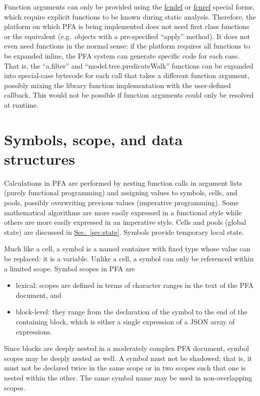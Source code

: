 \documentclass{article}
\theoremstyle{definition}
\begin{document}
Function arguments can only be provided using the \hyperlink{hsec:fcndef}{fcndef} or \hyperlink{hsec:fcnref}{fcnref} special forms, which require explicit functions to be known during static analysis.  Therefore, the platform on which PFA is being implemented does not need first class functions or the equivalent (e.g.\ objects with a pre-specified ``apply'' method).  It does not even need functions in the normal sense: if the platform requires all functions to be expanded inline, the PFA system can generate specific code for each case.  That is, the ``a.filter'' and ``model.tree.predicateWalk'' functions can be expanded into special-case bytecode for each call that takes a different function argument, possibly mixing the library function implementation with the user-defined callback.  This would not be possible if function arguments could only be resolved at runtime.

\pagebreak

\hypertarget{hsec:symbol-scope}{}
\section{Symbols, scope, and data structures}
\label{sec:symbol-scope}

Calculations in PFA are performed by nesting function calls in argument lists (purely functional programming) and assigning values to symbols, cells, and pools, possibly overwriting previous values (imperative programming).  Some mathematical algorithms are more easily expressed in a functional style while others are more easily expressed in an imperative style.  Cells and pools (global state) are discussed in \hyperlink{hsec:state}{Sec.~\ref{sec:state}}.  Symbols provide temporary local state.

Much like a cell, a symbol is a named container with fixed type whose value can be replaced: it is a variable.  Unlike a cell, a symbol can only be referenced within a limited scope.  Symbol scopes in PFA are
\begin{itemize}
\item lexical: scopes are defined in terms of character ranges in the text of the PFA document, and
\item block-level: they range from the declaration of the symbol to the end of the containing block, which is either a single expression of a JSON array of expressions.
\end{itemize}

Since blocks are deeply nested in a moderately complex PFA document, symbol scopes may be deeply nested as well.  A symbol must not be shadowed; that is, it must not be declared twice in the same scope or in two scopes such that one is nested within the other.  The same symbol name may be used in non-overlapping scopes.
\end{document}
